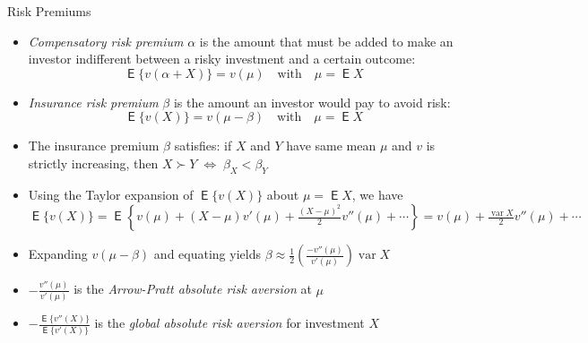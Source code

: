 \documentclass[10pt]{beamer}
\newcommand{\ds}{\displaystyle}
\newcommand{\ifff}{\;\Longleftrightarrow\;}
\DeclareMathOperator\expc{\mathsf{E}}
\DeclareMathOperator\var{var}
\theoremstyle{definition}
\begin{document}
\begin{frame}{Risk Premiums}
  \begin{itemize}[<+->]
    \item \emph{Compensatory risk premium} $\alpha$ is the amount that must be added to make an investor indifferent between a risky investment and a certain outcome:
      \[\expc\{v(\alpha + X)\} = v(\mu) \quad \text{with} \quad \mu = \expc X\]
    \item \emph{Insurance risk premium} $\beta$ is the amount an investor would pay to avoid risk:
      \[\expc\{v(X)\} = v(\mu - \beta) \quad \text{with} \quad \mu = \expc X\]
    \item The insurance premium $\beta$ satisfies: if $X$ and $Y$ have same mean $\mu$ and $v$ is strictly increasing, then $\ds X \succ Y \ifff \beta_X < \beta_Y$
    \item Using the Taylor expansion of $\expc\{v(X)\}$ about $\mu = \expc X$, we have $\ds\expc\{v(X)\} = \expc\left\{v(\mu) + (X - \mu)v'(\mu) + \frac{(X - \mu)^2}{2}v''(\mu) + \cdots\right\} = v(\mu) + \frac{\var X}{2}v''(\mu) + \cdots$
    \item Expanding $v(\mu - \beta)$ and equating yields $\ds\beta \approx \frac{1}{2}\left(\frac{-v''(\mu)}{v'(\mu)}\right)\var X$
    \item $\ds -\frac{v''(\mu)}{v'(\mu)}$ is the \emph{Arrow-Pratt absolute risk aversion} at $\mu$
    \item $\ds -\frac{\expc\{v''(X)\}}{\expc\{v'(X)\}}$ is the \emph{global absolute risk aversion} for investment $X$
  \end{itemize}
\end{frame}
\end{document}
